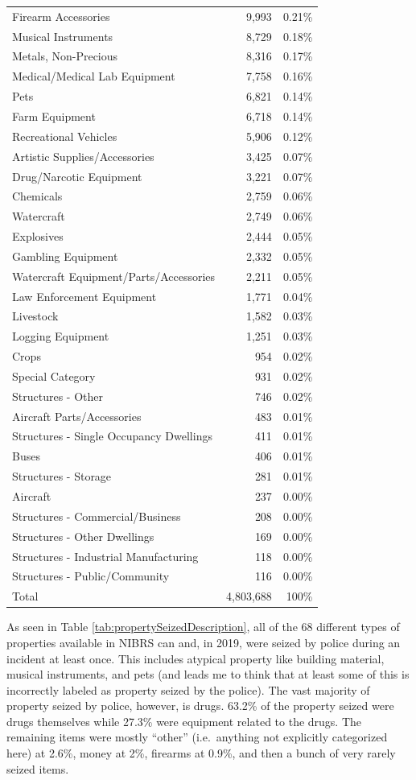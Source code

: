 \documentclass[
  12pt,
  openany]{book}
\begin{document}
\begin{longtable}[]{@{}lrr@{}}
Firearm Accessories & 9,993 & 0.21\%\tabularnewline
Musical Instruments & 8,729 & 0.18\%\tabularnewline
Metals, Non-Precious & 8,316 & 0.17\%\tabularnewline
Medical/Medical Lab Equipment & 7,758 & 0.16\%\tabularnewline
Pets & 6,821 & 0.14\%\tabularnewline
Farm Equipment & 6,718 & 0.14\%\tabularnewline
Recreational Vehicles & 5,906 & 0.12\%\tabularnewline
Artistic Supplies/Accessories & 3,425 & 0.07\%\tabularnewline
Drug/Narcotic Equipment & 3,221 & 0.07\%\tabularnewline
Chemicals & 2,759 & 0.06\%\tabularnewline
Watercraft & 2,749 & 0.06\%\tabularnewline
Explosives & 2,444 & 0.05\%\tabularnewline
Gambling Equipment & 2,332 & 0.05\%\tabularnewline
Watercraft Equipment/Parts/Accessories & 2,211 & 0.05\%\tabularnewline
Law Enforcement Equipment & 1,771 & 0.04\%\tabularnewline
Livestock & 1,582 & 0.03\%\tabularnewline
Logging Equipment & 1,251 & 0.03\%\tabularnewline
Crops & 954 & 0.02\%\tabularnewline
Special Category & 931 & 0.02\%\tabularnewline
Structures - Other & 746 & 0.02\%\tabularnewline
Aircraft Parts/Accessories & 483 & 0.01\%\tabularnewline
Structures - Single Occupancy Dwellings & 411 & 0.01\%\tabularnewline
Buses & 406 & 0.01\%\tabularnewline
Structures - Storage & 281 & 0.01\%\tabularnewline
Aircraft & 237 & 0.00\%\tabularnewline
Structures - Commercial/Business & 208 & 0.00\%\tabularnewline
Structures - Other Dwellings & 169 & 0.00\%\tabularnewline
Structures - Industrial Manufacturing & 118 & 0.00\%\tabularnewline
Structures - Public/Community & 116 & 0.00\%\tabularnewline
Total & 4,803,688 & 100\%\tabularnewline
\bottomrule
\end{longtable}

As seen in Table \ref{tab:propertySeizedDescription}, all of the 68 different types of properties available in NIBRS can and, in 2019, were seized by police during an incident at least once. This includes atypical property like building material, musical instruments, and pets (and leads me to think that at least some of this is incorrectly labeled as property seized by the police). The vast majority of property seized by police, however, is drugs. 63.2\% of the property seized were drugs themselves while 27.3\% were equipment related to the drugs. The remaining items were mostly ``other'' (i.e.~anything not explicitly categorized here) at 2.6\%, money at 2\%, firearms at 0.9\%, and then a bunch of very rarely seized items.
\end{document}

